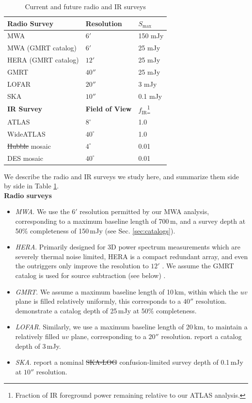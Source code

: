 \documentclass[numberedappendix]{emulateapj}
\newcommand{\ir}{\text{IR}}
\providecommand{\DIFadd}[1]{{\protect\color{blue}\uwave{#1}}} %
\providecommand{\DIFdel}[1]{{\protect\color{red}\sout{#1}}}                      %
\providecommand{\DIFaddbegin}{} %
\providecommand{\DIFaddend}{} %
\providecommand{\DIFdelbegin}{} %
\providecommand{\DIFdelend}{} %
\providecommand{\DIFaddFL}[1]{\DIFadd{#1}} %
\providecommand{\DIFdelFL}[1]{\DIFdel{#1}} %
\providecommand{\DIFaddbeginFL}{} %
\providecommand{\DIFaddendFL}{} %
\providecommand{\DIFdelbeginFL}{} %
\providecommand{\DIFdelendFL}{} %
\begin{document}
\begin{table}
\caption{Current and future radio and IR surveys\label{tab:expts}}
\begin{tabular}{|l | l | l|}
\hline
\textbf{Radio Survey} & \textbf{Resolution} & \textbf{$S_\text{max}$} \\
\hline
MWA & $6'$ & 150 mJy \\
MWA (GMRT catalog) & $6'$ & 25 mJy \\
HERA (GMRT catalog) & $12'$ & 25 mJy \\
GMRT & $40''$ & 25 mJy \\
LOFAR & $20''$ & 3 mJy \\
SKA & $10''$ & 0.1 mJy \\
\hline\hline
\textbf{IR Survey} & \textbf{Field of View} & \textbf{$f_\ir$}\footnote{Fraction of IR foreground power remaining relative to our ATLAS analysis.} \\
\hline
ATLAS & $8^\circ$ & 1.0 \\
WideATLAS & $40^\circ$ & 1.0 \\
\DIFdelbeginFL \DIFdelFL{Hubble }\DIFdelendFL \DIFaddbeginFL \DIFaddFL{WFIRST }\DIFaddendFL mosaic & $4^\circ$ & 0.01 \\
DES mosaic & $40^\circ$ & 0.01 \\
\hline
\end{tabular}
\end{table}


We describe the radio and IR surveys we study here, and summarize them side by side in Table \ref{tab:expts}. \\

\noindent\textbf{Radio surveys}
\begin{itemize}
\item \textit{MWA}. We use the $6'$ resolution permitted by our MWA analysis, corresponding to a maximum baseline length of 700\,m, and a survey depth at 50\% completeness of 150\,mJy (see Sec. \ref{sec:catalogs}).
\item \textit{HERA}. Primarily designed for 3D power spectrum measurements which are severely thermal noise limited, HERA is a compact redundant array, and even the outriggers only improve the resolution to $12'$ \DIFaddbegin \citep{deboer16}\DIFaddend . We assume the GMRT catalog is used for source subtraction (see below) \DIFdelbegin %
\DIFdelend .
\item \textit{GMRT}. We assume a maximum baseline length of 10\,km, within which the $uv$ plane is filled relatively uniformly, this corresponds to a $40''$ resolution. \citet{intema17} demonstrate a catalog depth of 25\,mJy at 50\% completeness.
\item \textit{LOFAR}. Similarly, we use a maximum baseline length of 20\,km, to maintain a relatively filled $uv$ plane, corresponding to a $20''$ resolution. \citet{lofareorpaper} report a catalog depth of 3\,mJy. 
\item \textit{SKA}. \citet{prandoni15} report a nominal \DIFdelbegin \DIFdel{SKA-LOG }\DIFdelend \DIFaddbegin \DIFadd{SKA-Low }\DIFaddend confusion-limited survey depth of 0.1\,mJy at $10''$ resolution.
\end{itemize}
\end{document}
